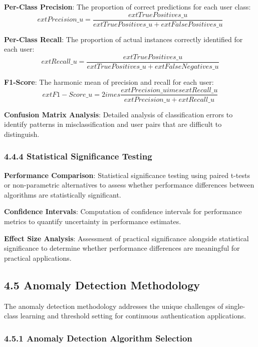 \documentclass[
  11pt,
  a4paper,
]{article}
\begin{document}
\textbf{Per-Class Precision}: The proportion of correct predictions for
each user class:
\[ ext{Precision}\_u = \frac{ ext{True Positives}\_u}{ ext{True Positives}\_u + ext{False Positives}\_u}\]

\textbf{Per-Class Recall}: The proportion of actual instances correctly
identified for each user:
\[ ext{Recall}\_u = \frac{ ext{True Positives}\_u}{ ext{True Positives}\_u + ext{False Negatives}\_u}\]

\textbf{F1-Score}: The harmonic mean of precision and recall for each
user:
\[ ext{F1-Score}\_u = 2 imes \frac{ ext{Precision}\_u imes ext{Recall}\_u}{ ext{Precision}\_u + ext{Recall}\_u}\]

\textbf{Confusion Matrix Analysis}: Detailed analysis of classification
errors to identify patterns in misclassification and user pairs that are
difficult to distinguish.

\subsubsection{4.4.4 Statistical Significance
Testing}\label{statistical-significance-testing}

\textbf{Performance Comparison}: Statistical significance testing using
paired t-tests or non-parametric alternatives to assess whether
performance differences between algorithms are statistically
significant.

\textbf{Confidence Intervals}: Computation of confidence intervals for
performance metrics to quantify uncertainty in performance estimates.

\textbf{Effect Size Analysis}: Assessment of practical significance
alongside statistical significance to determine whether performance
differences are meaningful for practical applications.

\subsection{4.5 Anomaly Detection
Methodology}\label{anomaly-detection-methodology}

The anomaly detection methodology addresses the unique challenges of
single-class learning and threshold setting for continuous
authentication applications.

\subsubsection{4.5.1 Anomaly Detection Algorithm
Selection}\label{anomaly-detection-algorithm-selection}
\end{document}
